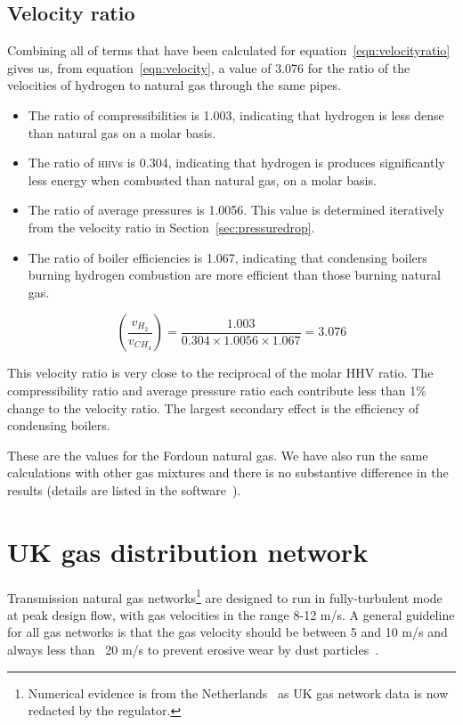 \documentclass[5p]{elsarticle} %
\begin{document}
\subsection{Velocity ratio}
\label{sec:velocity}

Combining all of terms that have been calculated for equation~\eqref{eqn:velocityratio} gives us,  from equation~\eqref{eqn:velocity}, a value of 3.076 for the ratio of the velocities of hydrogen to natural gas through the same pipes.
\begin{itemize}
    \item The ratio of compressibilities is 1.003, indicating that hydrogen is less dense than natural gas on a molar basis.
    \item The ratio of \textsc{hhv}s is 0.304, indicating that hydrogen is produces significantly less energy when combusted than natural gas, on a molar basis.
    \item The ratio of average pressures is 1.0056. This value is determined iteratively from the velocity ratio in Section~\ref{sec:pressuredrop}.
    \item The ratio of boiler efficiencies is 1.067, indicating that condensing boilers burning hydrogen combustion are more efficient than those burning natural gas. 
\end{itemize}

\begin{equation}
\label{eqn:velocity}
    \left(\frac{v_{H_2}}{v_{CH_4}}\right) = \frac{1.003}{0.304 \times  1.0056 \times 1.067} = \mathbf{3.076}
\end{equation}

This velocity ratio is very close to the reciprocal of the molar HHV ratio.
The compressibility ratio and average pressure ratio each contribute less than 1\% change to the velocity ratio.
The largest secondary effect is the efficiency of condensing boilers. 

These are the values for the Fordoun natural gas. 
We have also run the same calculations with other gas mixtures and there is no substantive difference in the results (details are listed in the software~\cite{Sargents_github}).

\section{UK gas distribution network}
\label{sec:network}

Transmission natural gas networks\footnote{Numerical evidence is from the Netherlands~\citep{Schouten2004} as UK gas network data is now redacted by the regulator.
} are designed to run  in fully-turbulent mode at peak design flow, with gas velocities in the range 8-12 m/s. 
A general guideline for all gas networks is that the gas velocity should be between 5 and 10 m/s and always less than ~20 m/s to prevent erosive wear by dust particles~\citep{Schouten2004,Tabkhi2008,Ejo2020}.
\end{document}
